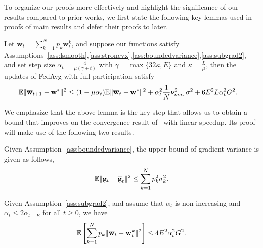 
To organize our proofs more effectively and highlight the significance of our results compared to prior works, 
we first state the following key lemmas used in proofs of main results and defer their proofs to later. 
\begin{lemma} Let $\overline{\mathbf{w}}_{t}=\sum_{k=1}^{N}p_{k}\mathbf{w}_{t}^{k}$, and
suppose our functions satisfy Assumptions~\ref{ass:lsmooth},\ref{ass:stroncvx},\ref{ass:boundedvariance},\ref{ass:subgrad2}, and set step size $\alpha_{t}=\frac{4}{\mu(\gamma+t)}$
	with $\gamma=\max\{32\kappa,E\}$ and $\kappa=\frac{L}{\mu}$, then the updates of FedAvg with full participation satisfy
	\begin{align*}
	\mathbb{E}\|{\overline{\mathbf{w}}}_{t+1}-{\mathbf{w}}^{\ast}\|^{2} & \leq(1-\mu\alpha_{t})\mathbb{E}\|{\overline{\mathbf{w}}}_{t}-{\mathbf{w}}^{\ast}\|^{2}+\alpha_{t}^{2}\frac{1}{N}\nu_{max}^{2}\sigma^{2}+6E^{2}L\alpha_{t}^{3}G^{2}.
	\end{align*}
\label{lem:scvxoner}
\end{lemma}
We emphasize that the above lemma is the key step that allows us to obtain a bound that improves on the convergence result of~\cite{li2019convergence} with linear speedup. Its proof will make use of the following two results. 
\begin{lemma}
Given Assumption~\ref{ass:boundedvariance}, the upper bound of gradient variance is given as follows,
\begin{align*}
	\mathbb{E}\|{\mathbf{g}}_{t}-{\overline{\mathbf{g}}}_{t}\|^{2} \leq \sum_{k=1}^{N}p_{k}^{2}\sigma_{k}^{2}.
	\end{align*}
\label{lem:bgv}
\end{lemma}

\begin{lemma}
Given Assumption~\ref{ass:subgrad2}, and assume that $\alpha_t$ is non-increasing and $\alpha_t \leq 2\alpha_{t+E}$ for all $t\geq 0$, we have
	\begin{align*}
	\mathbb{E}\left[\sum_{k=1}^{N}p_{k}\|{\overline{\mathbf{w}}}_{t}-{\mathbf{w}}_{t}^{k}\|^{2} \right]\leq 4E^{2}\alpha_{t}^{2}G^{2}.
	\end{align*}
\label{lem:bdw}
\end{lemma}

